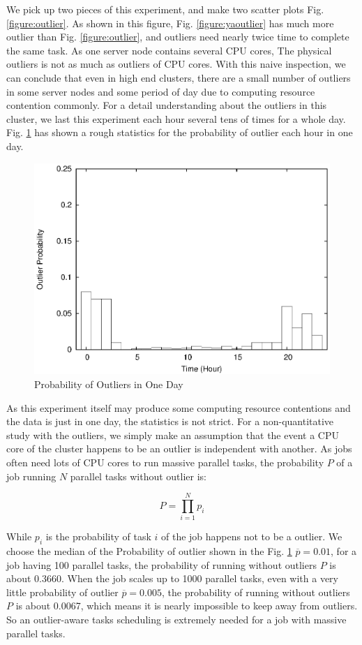 We pick up two pieces of this experiment, and make two scatter plots Fig. \ref{figure:outlier}. As shown in this figure, Fig.  \ref{figure:yaoutlier} has much more outlier than Fig. \ref{figure:outlier}, and outliers need nearly twice time to complete the same task. As one server node contains several CPU cores, The physical outliers is not as much as outliers of CPU cores. With this naive inspection, we can conclude that even in high end clusters, there are a small number of outliers in some server nodes and some period of day due to computing resource contention commonly. For a detail understanding about the outliers in this cluster, we last this experiment each hour several tens of times for a whole day. Fig. \ref{figure:outlier_stats} has shown a rough statistics for the probability of outlier each hour in one day.

\begin{figure}
\centering
\includegraphics[width=0.9\columnwidth]{figures/outlier_stats.eps}
\caption{Probability of Outliers in One Day}
\label{figure:outlier_stats}
\end{figure}

As this experiment itself may produce some computing resource contentions and the data is just in one day, the statistics is not strict. For a non-quantitative study with the outliers, we simply make an assumption that the event a CPU core of the cluster happens to be an outlier is independent with another. As jobs often need lots of CPU cores to run massive parallel tasks, the probability $P$ of a job running $N$ parallel tasks without outlier is:

$$P = \prod_{i=1}^N p_i$$

While $p_i$ is the probability of task $i$ of the job happens not to be a outlier. We choose the median of the Probability of outlier shown in the Fig. \ref{figure:outlier_stats} $\overline{p} = 0.01$, for a job having 100 parallel tasks, the probability of running without outliers $P$ is about 0.3660. When the job scales up to 1000 parallel tasks, even with a very little probability of outlier $\overline{p} = 0.005$, the probability of running without outliers $P$ is about 0.0067, which means it is nearly impossible to keep away from outliers. So an outlier-aware tasks scheduling is extremely needed for a job with massive parallel tasks.

